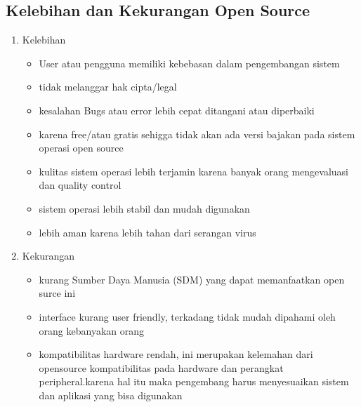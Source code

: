 \subsection{Kelebihan dan Kekurangan Open Source}
\begin{enumerate}
\item Kelebihan
\begin{itemize}
\item User atau pengguna memiliki kebebasan dalam pengembangan sistem
\item tidak melanggar hak cipta/legal
\item kesalahan Bugs atau error lebih cepat ditangani atau diperbaiki
\item karena free/atau gratis sehigga tidak akan ada versi bajakan pada sistem operasi open source
\item kulitas sistem operasi lebih terjamin karena banyak orang mengevaluasi dan quality control
\item sistem operasi lebih stabil dan mudah digunakan
\item lebih aman karena lebih tahan dari serangan virus
\end{itemize}

\item Kekurangan
\begin{itemize}
\item kurang Sumber Daya Manusia (SDM) yang dapat memanfaatkan open surce ini
\item interface kurang user friendly, terkadang tidak mudah dipahami oleh orang kebanyakan orang
\item kompatibilitas hardware rendah, ini merupakan kelemahan dari opensource kompatibilitas pada hardware dan perangkat peripheral.karena hal itu maka pengembang harus menyesuaikan sistem dan aplikasi yang bisa digunakan
\end{itemize}

\end{enumerate}

